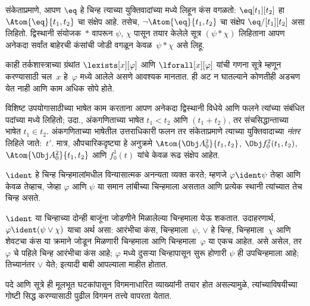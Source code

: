 संकेताप्रमाणे, आपण $\eq$ हे चिन्ह त्याच्या युक्तिवादांच्या मध्ये लिहून
कंस वगळतो: $\eq[t_1][t_2]$ हा $\Atom{\eq}{t_1,t_2}$ चा संक्षेप आहे.
तसेच, $\lnot \Atom{\eq}{t_1,t_2}$ चा संक्षेप $\eq/[t_1][t_2]$ असा
लिहितो. द्विस्थानी संयोजक~$\ast$ वापरून $\psi$, $\chi$ पासून तयार केलेले
सूत्र $(\psi \ast \chi)$ लिहिताना आपण अनेकदा सर्वांत बाहेरची कंसांची
जोडी वगळून केवळ~$\psi \ast \chi$ असे लिहू.

\begin{intro}
काही तर्कशास्त्राच्या ग्रंथांत
$\lexists[x][\varphi]$
आणि
$\lforall[x][\varphi]$
यांची गणना
सूत्रे म्हणून करण्यासाठी
चल~$x$ हे~$\varphi$ मध्ये आलेले असणे आवश्यक मानतात. ही अट न
घातल्याने कोणतीही अडचण येत नाही आणि काम अधिक सोपे होते.
\end{intro}



विशिष्ट उपयोगासाठीच्या भाषेत काम करताना आपण अनेकदा द्विस्थानी
विधेये आणि फलने त्यांच्या संबंधित पदांच्या मध्ये
लिहितो; उदा., अंकगणिताच्या भाषेत $t_1 < t_2$ आणि $(t_1 + t_2)$, तर
संचसिद्धान्ताच्या भाषेत $t_1 \in t_2$. अंकगणिताच्या भाषेतील उत्तराधिकारी
फलन तर संकेताप्रमाणे त्याच्या युक्तिवादाच्या \emph{नंतर} लिहिले
जाते:~$t'$. मात्र, औपचारिकदृष्ट्या हे अनुक्रमे
$\Atom{\Obj A^2_0}{t_1, t_2}$, $\Obj f^2_0(t_1, t_2)$,
$\Atom{\Obj A^2_0}{t_1, t_2}$ आणि $f^1_0(t)$ यांचे केवळ रूढ संक्षेप आहेत.

\begin{defn}[विन्यासात्मक अनन्यता]
$\ident$ हे चिन्ह चिन्हमालांमधील विन्यासात्मक अनन्यता व्यक्त करते;
म्हणजे $\varphi \ident \psi$ तेव्हा आणि केवळ तेव्हाच, जेव्हा $\varphi$ आणि $\psi$
या समान लांबीच्या चिन्हमाला असतात आणि प्रत्येक स्थानी त्यांच्यात तेच
चिन्ह असते.
\end{defn}

$\ident$ या चिन्हाच्या दोन्ही बाजूंना जोडणीने मिळालेल्या चिन्हमाला
येऊ शकतात. उदाहरणार्थ, $\varphi \ident (\psi \lor \chi)$ याचा अर्थ असा:
आरंभीचा कंस, चिन्हमाला~$\psi$, $\lor$ हे चिन्ह, चिन्हमाला~$\chi$ आणि
शेवटचा कंस या क्रमाने जोडून मिळणारी चिन्हमाला आणि चिन्हमाला~$\varphi$
या एकच आहेत. असे असेल, तर $\varphi$ चे पहिले चिन्ह आरंभीचा कंस आहे;
$\varphi$ मध्ये दुसऱ्या चिन्हापासून सुरू होणारी $\psi$ ही उपचिन्हमाला आहे;
तिच्यानंतर $\lor$ येते; इत्यादी बाबी आपल्याला माहीत होतात.

पदे आणि सूत्रे ही मूलभूत घटकांपासून विगमनाधारित व्याख्यांनी तयार
होत असल्यामुळे, त्यांच्याविषयीच्या गोष्टी सिद्ध करण्यासाठी पुढील विगमन
तत्त्वे वापरता येतात.

